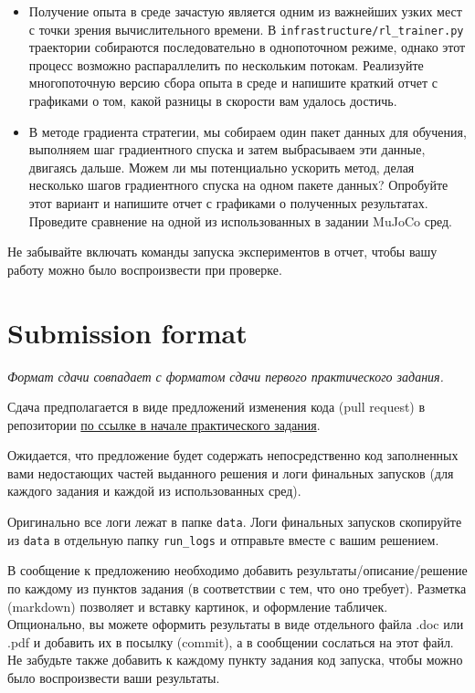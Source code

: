 \documentclass[12pt, oneside]{article}
\begin{document}
\begin{itemize}
    \item Получение опыта в среде зачастую является одним из важнейших узких мест с точки зрения вычислительного времени. В \verb|infrastructure/rl_trainer.py| траектории собираются последовательно в однопоточном режиме, однако этот процесс возможно распараллелить по нескольким потокам. Реализуйте многопоточную версию сбора опыта в среде и напишите краткий отчет с графиками о том, какой разницы в скорости вам удалось достичь.
    \item В методе градиента стратегии, мы собираем один пакет данных для обучения, выполняем шаг градиентного спуска и затем выбрасываем эти данные, двигаясь дальше. Можем ли мы потенциально ускорить метод, делая несколько шагов градиентного спуска на одном пакете данных? Опробуйте этот вариант и напишите отчет с графиками о полученных результатах. Проведите сравнение на одной из использованных в задании MuJoCo сред.
\end{itemize}

Не забывайте включать команды запуска экспериментов в отчет, чтобы вашу работу можно было воспроизвести при проверке.

\section{Submission format}

\textit{Формат сдачи совпадает с форматом сдачи первого практического задания.}

Сдача предполагается в виде предложений изменения кода (pull request) в репозитории \href{https://github.com/pkuderov/mipt-rl-hw-2022}{по ссылке в начале практического задания}.

Ожидается, что предложение будет содержать непосредственно код заполненных вами недостающих частей выданного решения и логи финальных запусков (для каждого задания и каждой из использованных сред). 

Оригинально все логи лежат в папке \verb|data|. Логи финальных запусков скопируйте из \verb|data| в отдельную папку \verb|run_logs| и отправьте вместе с вашим решением.

В сообщение к предложению необходимо добавить результаты/описание/решение по каждому из пунктов задания (в соответствии с тем, что оно требует). Разметка (markdown) позволяет и вставку картинок, и оформление табличек. Опционально, вы можете оформить результаты в виде отдельного файла .doc или .pdf и добавить их в посылку (commit), а в сообщении сослаться на этот файл. Не забудьте также добавить к каждому пункту задания код запуска, чтобы можно было воспроизвести ваши результаты.
\end{document}
